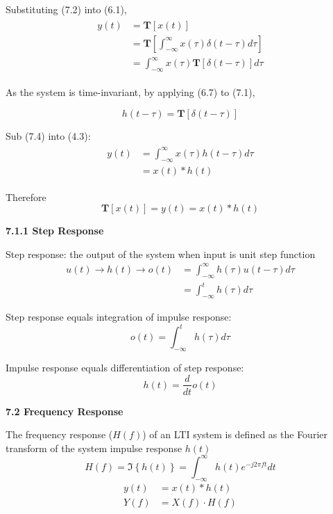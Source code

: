 \documentclass[landscape,a4paper]{extarticle}
\newcommand{\T}{\textbf{T}}
\newcommand{\fourier}[1]{\Im\left\{#1\right\}}
\begin{document}
\begin{multicols*}{5}
    Substituting (7.2) into (6.1), 
    \begin{align*}
        \begin{split}
            y(t) &= \T[x(t)]\\
            &= \T\left[\int_{-\infty}^{\infty}x(\tau)\delta(t-\tau) d\tau\right]\\
            &= \int_{-\infty}^{\infty}x(\tau)\T[\delta(t-\tau)]d\tau
        \end{split} \tag{7.3}
    \end{align*}

    As the system is time-invariant, by applying (6.7) to (7.1),

    \[
        h(t-\tau) = \T\left[\delta(t-\tau)\right] \tag{7.4}
    \]

    Sub (7.4) into (4.3):
    \begin{align*}
        \begin{split}
            y(t) &= \int_{-\infty}^{\infty}x(\tau)h(t-\tau) d\tau\\
            &= x(t) * h(t)
        \end{split} 
        \tag{7.5}
    \end{align*}

    Therefore
    \[
        \T[x(t)] = y(t) = x(t) * h(t)
    \]

    \textbf{7.1.1 Step Response}

    Step response: the output of the system when input is unit step function
    \begin{align*}
        u(t) \rightarrow h(t) \rightarrow o(t) &= \int_{-\infty}^{\infty}h(\tau) u(t-\tau) d \tau\\
        &= \int_{-\infty}^{t}h(\tau) d \tau
    \end{align*}

    Step response equals integration of impulse response:
    \[
        o(t) = \int_{-\infty}^{t}h(\tau) d\tau
    \]

    Impulse response equals differentiation of step response:
    \[
        h(t) = \frac{d}{dt} o(t)
    \]

    \textbf{7.2 Frequency Response}

    The frequency response ($H(f)$) of an LTI system is defined as the Fourier transform of the system impulse response $h(t)$
    \[
        H(f) = \fourier{h(t)} = \int_{-\infty}^{\infty} h(t) e^{-j2\pi ft} dt \tag{7.6}
    \]
    \begin{align*}
        y(t) &= x(t) * h(t)\\
        Y(f) &= X(f) \cdot H(f) \tag{7.7}
    \end{align*}


\end{multicols*}
\end{document}
